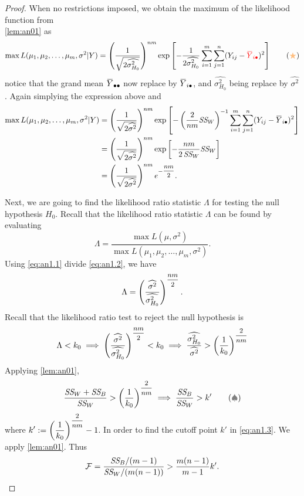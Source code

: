 \begin{proof}
    When no restrictions imposed, we obtain the maximum of the likelihood function from\\ \cref{lem:an01} as
    \[
        \max L(\mu_1, \mu_2, \ldots, \mu_m, \sigma^2 | Y)
        = \left( \frac{1}{ \sqrt{2\widehat{\sigma^2_{H_0}}}} \right)^{nm} \exp \left[ - \frac{1}{2\widehat{\sigma^2_{H_0}}} \sum^{m}_{i=1} \sum^n_{j=1} (Y_{ij} - {\color{red} \ols{Y}_{i \bullet}})^2\right]
        \label{eq:an1.2} \tag{{\color{orange!50!white} $\bigstar $}}
    \]
    notice that the grand mean $\ols{Y}_{\bullet \bullet}$ now replace by $\ols{Y}_{i \bullet}$, 
    and $\widehat{\sigma^2_{H_0}}$ being replace by $\widehat{\sigma^2}$. Again 
    simplying the expression above and 
    \begin{align*}
        \max L(\mu_1, \mu_2, \ldots, \mu_m, \sigma^2 | Y) &= \left( \frac{1}{ \sqrt{2\widehat{\sigma^2}}} \right)^{nm} \exp \left[ - \left(\frac{2}{nm} \CS{W} \right)^{-1} \sum^{m}_{i=1} \sum^n_{j=1} (Y_{ij} - \ols{Y}_{i \bullet})^2\right]\\
        &= \left( \frac{1}{ \sqrt{2\widehat{\sigma^2}}} \right)^{nm} \exp \left[ - \frac{nm}{2 \, \CS{W}} \CS{W} \right]\\
        &=  \left( \frac{1}{ \sqrt{2\widehat{\sigma^2}}} \right)^{nm} e^{-\mfrac{nm}{2}}.
    \end{align*}

    Next, we are going to find the likelihood ratio statistic $\Lambda$ for testing the null hypothesis $H_0$. 
    Recall that the likelihood ratio statistic $\Lambda$ can be found by evaluating 
    \[
        \Lambda = \frac{\max L(\mu, \sigma^2)}{\max L(\mu_1, \mu_2, \ldots, \mu_m, \sigma^2)}.
    \]
    Using \eqref{eq:an1.1} divide \eqref{eq:an1.2}, we have 
    \[
        \Lambda = \left( \frac{\widehat{\sigma^2} }{\widehat{\sigma^2_{H_0}}} \right)^{\mfrac{nm}{2}}.
    \]
    Recall that the likelihood ratio test to reject the null hypothesis is 
    \[
        \Lambda < k_0 \implies \left( \frac{\widehat{\sigma^2} }{\widehat{\sigma^2_{H_0}}} \right)^{\mfrac{nm}{2}} < k_0 
        \implies \frac{\widehat{\sigma^2_{H_0}}}{ \widehat{\sigma^2}} > \left( \frac{1}{k_0} \right)^{\mfrac{2}{nm}}
    \]
    Applying \cref{lem:an01},
    \[
        \frac{\CS{W} + \CS{B}}{\CS{W}} > \left( \frac{1}{k_0} \right)^{\mfrac{2}{nm}} \implies 
        \frac{\CS{B}}{\CS{W}} > k' \label{eq:an1.3} \tag{{\color{gray} $\spadesuit $}}
    \]
    where $\displaystyle k' := \left( \frac{1}{k_0} \right)^{\mfrac{2}{nm}} - 1$. In order to find the 
    cutoff point $k'$ in \eqref{eq:an1.3}. We apply \cref{lem:an01}. Thus 
    \[
        \mathcal{F} = \frac{\textit{SS}_{B} / (m-1)}{\textit{SS}_{W} / (m(n-1))} > \frac{m(n-1)}{m-1}k'.
    \] 
\end{proof}

